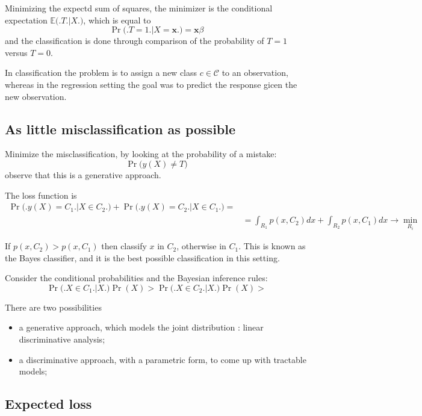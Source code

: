 \documentclass[a4paper]{article}
\newcommand{\Ccal}{\mathcal{C}}
\newcommand{\Ex}[0]{{\mathbb{E}}}
\begin{document}
Minimizing the expectd sum of squares, the minimizer is the conditional expectation $\Ex\big(\big. T\big.\big\rvert X\big.\big)$, which is equal to 
\[\Pr\big(\big. T = 1\big.\big\rvert X = \mathbf{x}\big.\big) = \mathbf{x}\beta\]
and the classification is done through comparison of the probability of $T=1$ versus $T=0$.

In classification the problem is to assign a new class $c\in \Ccal$ to an observation, whereas in the regression setting the goal was to predict the response gicen the new observation.

\subsection{As little misclassification as possible} %
\label{sub:as_little_misclassification_as_possible}

Minimize the misclassification, by looking at the probability of a mistake:
\[\Pr\big(y(X)\neq T\big)\]
observe that this is a generative approach.

The loss function is
\begin{align*}
	\Pr\big(\big. y(X) = C_1\big.\big\rvert X\in C_2\big.\big) + \Pr\big(\big. y(X) = C_2\big.\big\rvert X\in C_1\big.\big) = \\
	&= \int_{R_1} p(x, C_2) dx + \int_{R_2} p(x, C_1) dx \to \min_{R_i}
\end{align*}

If $p(x, C_2) > p(x, C_1)$ then classify $x$ in $C_2$, otherwise in $C_1$.
This is known as the Bayes classifier, and it is the best possible classification in this setting.

Consider the conditional probabilities and the Bayesian inference rules:
\[\Pr\big(\big. X\in C_1\big.\big\rvert X\big.\big) \Pr( X ) > \Pr\big(\big. X\in C_2\big.\big\rvert X\big.\big) \Pr( X ) > \]

There are two possibilities \begin{itemize}
	\item a generative approach, which models the joint distribution : linear discriminative analysis;
	\item a discriminative approach, with a parametric form, to come up with tractable models;
\end{itemize}


\subsection{Expected loss} %
\label{sub:expected_loss}
\end{document}
